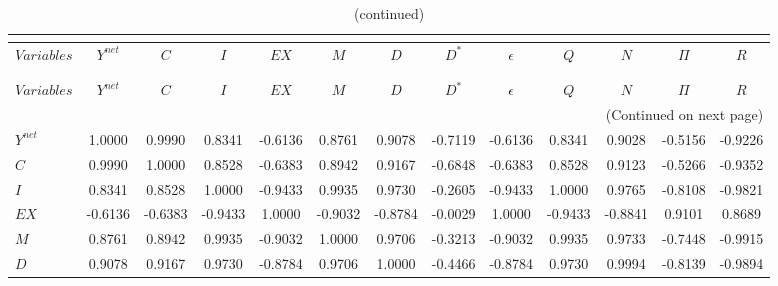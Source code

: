  
\begin{center}
\begin{longtable}{lcccccccccccc} 
\caption{MATRIX OF CORRELATIONS}\\
 \label{Table:th_corr_matrix}\\
\toprule 
$Variables  $	 & 	 $     Y^{net}$	 & 	 $           C$	 & 	 $           I$	 & 	 $          EX$	 & 	 $           M$	 & 	 $           D$	 & 	 $       D^{*}$	 & 	 $   \epsilon$	 & 	 $           Q$	 & 	 $           N$	 & 	 $        \Pi$	 & 	 $           R$\\
\midrule \endfirsthead 
\caption{(continued)}\\
 \toprule \\ 
$Variables  $	 & 	 $     Y^{net}$	 & 	 $           C$	 & 	 $           I$	 & 	 $          EX$	 & 	 $           M$	 & 	 $           D$	 & 	 $       D^{*}$	 & 	 $   \epsilon$	 & 	 $           Q$	 & 	 $           N$	 & 	 $        \Pi$	 & 	 $           R$\\
\midrule \endhead 
\midrule \multicolumn{13}{r}{(Continued on next page)} \\ \bottomrule \endfoot 
\bottomrule \endlastfoot 
$Y^{net}    $	 & 	      1.0000	 & 	      0.9990	 & 	      0.8341	 & 	     -0.6136	 & 	      0.8761	 & 	      0.9078	 & 	     -0.7119	 & 	     -0.6136	 & 	      0.8341	 & 	      0.9028	 & 	     -0.5156	 & 	     -0.9226 \\ 
$C          $	 & 	      0.9990	 & 	      1.0000	 & 	      0.8528	 & 	     -0.6383	 & 	      0.8942	 & 	      0.9167	 & 	     -0.6848	 & 	     -0.6383	 & 	      0.8528	 & 	      0.9123	 & 	     -0.5266	 & 	     -0.9352 \\ 
$I          $	 & 	      0.8341	 & 	      0.8528	 & 	      1.0000	 & 	     -0.9433	 & 	      0.9935	 & 	      0.9730	 & 	     -0.2605	 & 	     -0.9433	 & 	      1.0000	 & 	      0.9765	 & 	     -0.8108	 & 	     -0.9821 \\ 
$EX         $	 & 	     -0.6136	 & 	     -0.6383	 & 	     -0.9433	 & 	      1.0000	 & 	     -0.9032	 & 	     -0.8784	 & 	     -0.0029	 & 	      1.0000	 & 	     -0.9433	 & 	     -0.8841	 & 	      0.9101	 & 	      0.8689 \\ 
$M          $	 & 	      0.8761	 & 	      0.8942	 & 	      0.9935	 & 	     -0.9032	 & 	      1.0000	 & 	      0.9706	 & 	     -0.3213	 & 	     -0.9032	 & 	      0.9935	 & 	      0.9733	 & 	     -0.7448	 & 	     -0.9915 \\ 
$D          $	 & 	      0.9078	 & 	      0.9167	 & 	      0.9730	 & 	     -0.8784	 & 	      0.9706	 & 	      1.0000	 & 	     -0.4466	 & 	     -0.8784	 & 	      0.9730	 & 	      0.9994	 & 	     -0.8139	 & 	     -0.9894 \\ 

\end{longtable}
\end{center}
